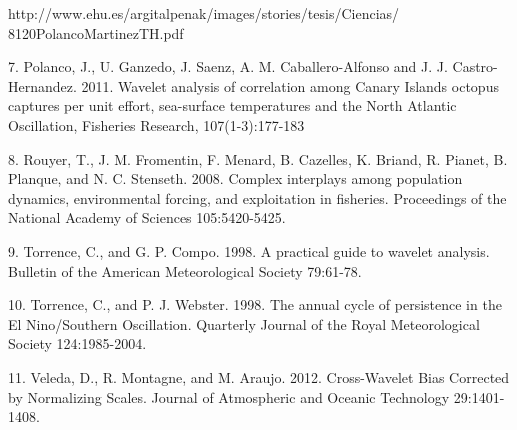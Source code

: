 http://www.ehu.es/argitalpenak/images/stories/tesis/Ciencias/ 8120PolancoMartinezTH.pdf



 7. Polanco, J., U. Ganzedo, J. Saenz, A. M. Caballero-Alfonso and J. J. Castro-Hernandez. 2011. Wavelet analysis of correlation among Canary Islands octopus captures per unit effort, sea-surface temperatures and the North Atlantic Oscillation, Fisheries Research, 107(1-3):177-183





 8. Rouyer, T., J. M. Fromentin, F. Menard, B. Cazelles, K. Briand, R. Pianet, B. Planque, and N. C. Stenseth. 2008. Complex interplays among population dynamics, environmental forcing, and exploitation in fisheries. Proceedings of the National Academy of Sciences 105:5420-5425.



  9. Torrence, C., and G. P. Compo. 1998. A practical guide to wavelet analysis. Bulletin of the American Meteorological Society 79:61-78.



  10. Torrence, C., and P. J. Webster. 1998. The annual cycle of persistence in the El Nino/Southern Oscillation. Quarterly Journal of the Royal Meteorological Society 124:1985-2004.



  11.  Veleda, D., R. Montagne, and M. Araujo. 2012. Cross-Wavelet Bias Corrected by Normalizing Scales. Journal of Atmospheric and Oceanic Technology 29:1401-1408.



%

%
